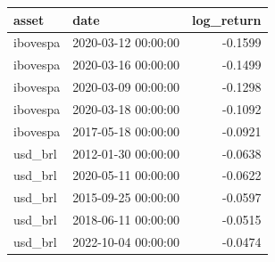 \begin{tabular}{llr}
\toprule
asset & date & log_return \\
\midrule
ibovespa & 2020-03-12 00:00:00 & -0.1599 \\
ibovespa & 2020-03-16 00:00:00 & -0.1499 \\
ibovespa & 2020-03-09 00:00:00 & -0.1298 \\
ibovespa & 2020-03-18 00:00:00 & -0.1092 \\
ibovespa & 2017-05-18 00:00:00 & -0.0921 \\
usd_brl & 2012-01-30 00:00:00 & -0.0638 \\
usd_brl & 2020-05-11 00:00:00 & -0.0622 \\
usd_brl & 2015-09-25 00:00:00 & -0.0597 \\
usd_brl & 2018-06-11 00:00:00 & -0.0515 \\
usd_brl & 2022-10-04 00:00:00 & -0.0474 \\
\bottomrule
\end{tabular}
